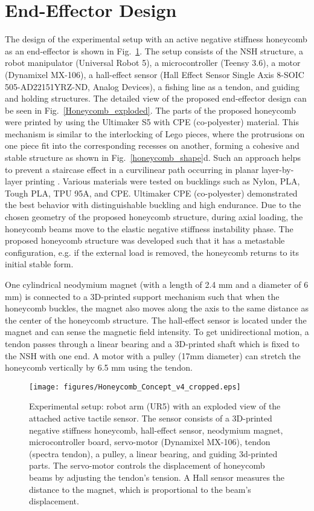 \documentclass[lettersize,journal]{IEEEtran}
\begin{document}
\section{End-Effector Design}
\label{sec:design}

The design of the experimental setup with an active negative stiffness honeycomb as an end-effector is shown in Fig.~\ref{setup_concept}. The setup consists of the NSH structure, a robot manipulator (Universal Robot 5), a microcontroller (Teensy 3.6), a motor (Dynamixel MX-106), a hall-effect sensor (Hall Effect Sensor Single Axis 8-SOIC 505-AD22151YRZ-ND, Analog Devices), a fishing line as a tendon, and guiding and holding structures. The detailed view of the proposed end-effector design can be seen in Fig.~\ref{Honeycomb_exploded}. The parts of the proposed honeycomb were printed by using the Ultimaker S5 with CPE (co-polyester) material. This mechanism is similar to the interlocking of Lego pieces, where the protrusions on one piece fit into the corresponding recesses on another, forming a cohesive and stable structure as shown in Fig.~\ref{honeycomb_shape}d. Such an approach helps to prevent a staircase effect in a curvilinear path occurring in planar layer-by-layer printing \cite{oropallo2016ten}. Various materials were tested on bucklings such as Nylon, PLA, Tough PLA, TPU 95A, and CPE. Ultimaker CPE (co-polyester) demonstrated the best behavior with distinguishable buckling and high endurance. Due to the chosen geometry of the proposed honeycomb structure, during axial loading, the honeycomb beams move to the elastic negative stiffness instability phase. The proposed honeycomb structure was developed such that it has a metastable configuration, e.g. if the external load is removed, the honeycomb returns to its initial stable form. 

One cylindrical neodymium magnet (with a length of 2.4 mm and a diameter of 6 mm) is connected to a 3D-printed support mechanism such that when the honeycomb buckles, the magnet also moves along the axis to the same distance as the center of the honeycomb structure. The hall-effect sensor is located under the magnet and can sense the magnetic field intensity. To get unidirectional motion, a tendon passes through a linear bearing and a 3D-printed shaft which is fixed to the NSH with one end. A motor with a pulley (17mm diameter) can stretch the honeycomb vertically by 6.5 mm using the tendon.
\begin{figure}[thpb]
\centering
    \texttt{[image: figures/Honeycomb\_Concept\_v4\_cropped.eps]}
\caption {Experimental setup: robot arm (UR5) with an exploded view of the attached active tactile sensor. The sensor consists of a 3D-printed negative stiffness honeycomb, hall-effect sensor, neodymium magnet, microcontroller board, servo-motor (Dynamixel MX-106), tendon (spectra tendon), a pulley, a linear bearing, and guiding 3d-printed parts. The servo-motor controls the displacement of honeycomb beams by adjusting the tendon's tension. A Hall sensor measures the distance to the magnet, which is proportional to the beam's displacement.}
\label{setup_concept}
\vspace{-3mm}
\end{figure}
\end{document}
